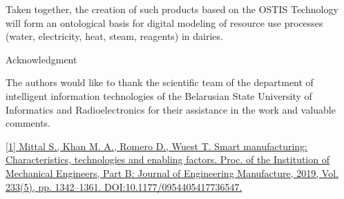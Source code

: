 \documentclass{article}
\begin{document}
\begin{multicols}{2}
\begin{itemize}
{}
\end{itemize}
Taken together, the creation of such products based
on the OSTIS Technology will form an ontological basis
for digital modeling of resource use processes (water,
electricity, heat, steam, reagents) in dairies.

\vspace{0.2cm}
\begin{center}
    

Acknowledgment
\end{center}
\vspace{0.2cm}

The authors would like to thank the scientific team
of the department of intelligent information technologies
of the Belarusian State University of Informatics and
Radioelectronics for their assistance in the work and
valuable comments.

\vspace{0.2cm}
\vspace{

}
\begin{thebibliography}{10}

\renewcommand{\bibname}{}
\setlength{\parskip}{-0.1cm}
\linespread{0cm}
\begin{description}
\item \href{http://www.overleaf.xn--com}{ [1] Mittal S., Khan M. A., Romero D., Wuest T. Smart manufacturing: Characteristics, technologies and enabling factors. Proc.
of the Institution of Mechanical Engineers, Part B: Journal of
Engineering Manufacture, 2019, Vol. 233(5), pp. 1342–1361.
DOI:10.1177/0954405417736547.}


\end{description}
\end{thebibliography}
\end{multicols}
\end{document}
